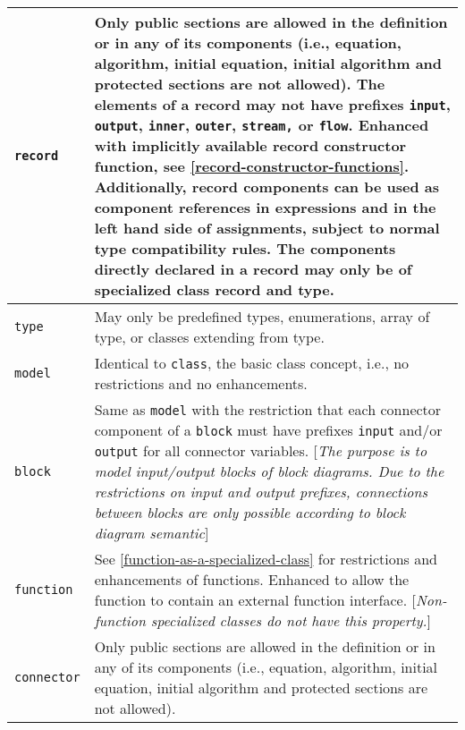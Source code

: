 \begin{longtable}{|p{4cm}|p{9cm}|}
\hline \endhead
\lstinline!record! & Only public sections are allowed in the definition or
in any of its components (i.e., equation, algorithm, initial equation,
initial algorithm and protected sections are not allowed). The elements
of a record may not have prefixes \lstinline!input!, \lstinline!output!,
\lstinline!inner!, \lstinline!outer!, \lstinline!stream,!
or \lstinline!flow!. Enhanced with implicitly available record constructor function,
see \autoref{record-constructor-functions}. Additionally, record components can be used as
component references in expressions and in the left hand side of
assignments, subject to normal type compatibility rules. The components
directly declared in a record may only be of specialized class record
and type.\\ \hline
\lstinline!type! & May only be predefined types, enumerations, array of
type, or classes extending from type.\\ \hline
\lstinline!model! & Identical to \lstinline!class!, the basic class concept, i.e., no
restrictions and no enhancements.\\ \hline
\lstinline!block! & Same as \lstinline!model! with the restriction that each connector
component of a \lstinline!block! must have prefixes \lstinline!input! and/or \lstinline!output! for all
connector variables. {[}\emph{The purpose is to model input/output
blocks of block diagrams. Due to the restrictions on input and output
prefixes, connections between blocks are only possible according to
block diagram semantic}{]}\\ \hline
\lstinline!function! & See \autoref{function-as-a-specialized-class} for restrictions
and enhancements of functions. Enhanced to allow the
function to contain an external function interface.
{[}\emph{Non-function specialized classes do not have this
property.}{]}\\ \hline
\lstinline!connector! & Only public sections are allowed in the definition or in any of its
components (i.e., equation, algorithm, initial equation, initial
algorithm and protected sections are not allowed).


\end{longtable}
